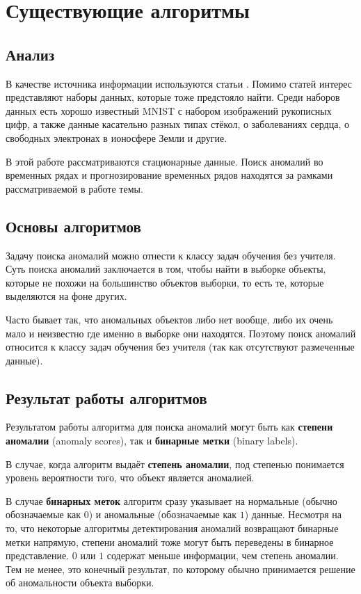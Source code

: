 \chapter{Существующие алгоритмы} \label{ch:ch2}

\section{Анализ} \label{sec:ch2/sec1}

В качестве источника информации используются статьи \cite{dai, hodge, vakili, varun, billor, wilkinson}. Помимо статей интерес представляют наборы данных, которые тоже предстояло найти. Среди наборов данных есть хорошо известный MNIST с набором изображений рукописных цифр, а также данные касательно разных типах стёкол, о заболеваниях сердца, о свободных электронах в ионосфере Земли и другие.

В этой работе рассматриваются стационарные данные. Поиск аномалий во временных рядах и прогнозирование временных рядов находятся за рамками рассматриваемой в работе темы.

\section{Основы алгоритмов} \label{sec:ch2/sec2}

Задачу поиска аномалий можно отнести к классу задач обучения без учителя. Суть поиска аномалий заключается в том, чтобы найти в выборке объекты, которые не похожи на большинство объектов выборки, то есть те, которые выделяются на фоне других.

Часто бывает так, что аномальных объектов либо нет вообще, либо их очень мало и неизвестно где именно в выборке они находятся. Поэтому поиск аномалий относится к классу задач обучения без учителя (так как отсутствуют размеченные данные).

\section{Результат работы алгоритмов} \label{sec:ch1/sec2}

Результатом работы алгоритма для поиска аномалий могут быть как \textbf{степени аномалии} (anomaly scores), так и \textbf{бинарные метки} (binary labels).

В случае, когда алгоритм выдаёт \textbf{степень аномалии}, под степенью понимается уровень вероятности того, что объект является аномалией.

В случае \textbf{бинарных меток} алгоритм сразу указывает на нормальные (обычно обозначаемые как $0$) и аномальные (обозначаемые как $1$) данные. Несмотря на то, что некоторые алгоритмы детектирования аномалий возвращают бинарные метки напрямую, степени аномалий тоже могут быть переведены в бинарное представление. $0$ или $1$ содержат меньше информации, чем степень аномалии. Тем не менее, это конечный результат, по которому обычно принимается решение об аномальности объекта выборки.

